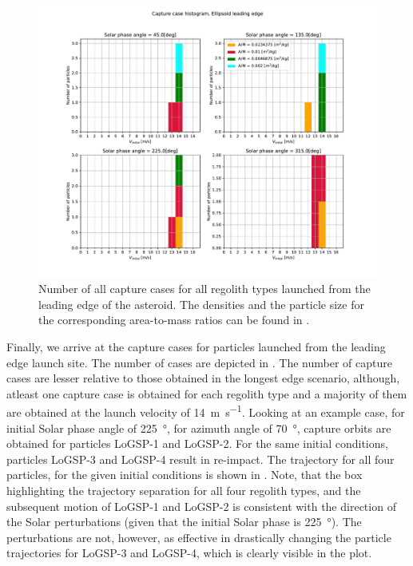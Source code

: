 \begin{figure}[htb]
\centering
\captionsetup{justification=centering}
\includegraphics[width=\textwidth, height=0.5\textheight, keepaspectratio=true]{leading_edge_perturbations/allCaptureCases.pdf}
\caption{Number of all capture cases for all regolith types launched from the leading edge of the asteroid. The densities and the particle size for the corresponding area-to-mass ratios can be found in .}
\label{fig:leadingEdge_allParticles_capture_hist}
\end{figure}
\FloatBarrier
Finally, we arrive at the capture cases for particles launched from the leading edge launch site. The number of cases are depicted in . The number of capture cases are lesser relative to those obtained in the longest edge scenario, although, atleast one capture case is obtained for each regolith type and a majority of them are obtained at the launch velocity of \SI{14}{\metre\per\second}. Looking at an example case, for initial Solar phase angle of \SI{225}{\degree}, for azimuth angle of \SI{70}{\degree}, capture orbits are obtained for particles LoGSP-1 and LoGSP-2. For the same initial conditions, particles LoGSP-3 and LoGSP-4 result in re-impact. The trajectory for all four particles, for the given initial conditions is shown in . Note, that the box highlighting the trajectory separation for all four regolith types, and the subsequent motion of LoGSP-1 and LoGSP-2 is consistent with the direction of the Solar perturbations (given that the initial Solar phase is \SI{225}{\degree}). The perturbations are not, however, as effective in drastically changing the particle trajectories for LoGSP-3 and LoGSP-4, which is clearly visible in the plot.
